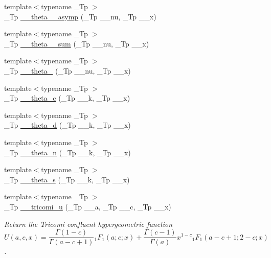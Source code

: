 \begin{DoxyCompactItemize}
\item 
{\footnotesize template$<$typename \+\_\+\+Tp $>$ }\\\+\_\+\+Tp \hyperlink{namespacestd_1_1____detail_a975a9a52a8a483849dd0877c24ca5d74}{\+\_\+\+\_\+theta\+\_\+\_\+asymp} (\+\_\+\+Tp \+\_\+\+\_\+nu, \+\_\+\+Tp \+\_\+\+\_\+x)
\item 
{\footnotesize template$<$typename \+\_\+\+Tp $>$ }\\\+\_\+\+Tp \hyperlink{namespacestd_1_1____detail_a3dc1b5188464b81b6acbb2983ef0f77c}{\+\_\+\+\_\+theta\+\_\+\_\+sum} (\+\_\+\+Tp \+\_\+\+\_\+nu, \+\_\+\+Tp \+\_\+\+\_\+x)
\item 
{\footnotesize template$<$typename \+\_\+\+Tp $>$ }\\\+\_\+\+Tp \hyperlink{namespacestd_1_1____detail_a274d3801b84bcaad13c274c8bab32bcc}{\+\_\+\+\_\+theta\+\_} (\+\_\+\+Tp \+\_\+\+\_\+nu, \+\_\+\+Tp \+\_\+\+\_\+x)
\item 
{\footnotesize template$<$typename \+\_\+\+Tp $>$ }\\\+\_\+\+Tp \hyperlink{namespacestd_1_1____detail_af95cdf16bfcf6c138d621b0c518a3299}{\+\_\+\+\_\+theta\+\_\+c} (\+\_\+\+Tp \+\_\+\+\_\+k, \+\_\+\+Tp \+\_\+\+\_\+x)
\item 
{\footnotesize template$<$typename \+\_\+\+Tp $>$ }\\\+\_\+\+Tp \hyperlink{namespacestd_1_1____detail_ad4ca29063a2f624e185592497d37a670}{\+\_\+\+\_\+theta\+\_\+d} (\+\_\+\+Tp \+\_\+\+\_\+k, \+\_\+\+Tp \+\_\+\+\_\+x)
\item 
{\footnotesize template$<$typename \+\_\+\+Tp $>$ }\\\+\_\+\+Tp \hyperlink{namespacestd_1_1____detail_aace76210c8f70761bb14ab602b88d027}{\+\_\+\+\_\+theta\+\_\+n} (\+\_\+\+Tp \+\_\+\+\_\+k, \+\_\+\+Tp \+\_\+\+\_\+x)
\item 
{\footnotesize template$<$typename \+\_\+\+Tp $>$ }\\\+\_\+\+Tp \hyperlink{namespacestd_1_1____detail_aeac5da2d394fafe6432871abf5c05413}{\+\_\+\+\_\+theta\+\_\+s} (\+\_\+\+Tp \+\_\+\+\_\+k, \+\_\+\+Tp \+\_\+\+\_\+x)
\item 
{\footnotesize template$<$typename \+\_\+\+Tp $>$ }\\\+\_\+\+Tp \hyperlink{namespacestd_1_1____detail_ae67133e463041158ebbffe6c54af6e0a}{\+\_\+\+\_\+tricomi\+\_\+u} (\+\_\+\+Tp \+\_\+\+\_\+a, \+\_\+\+Tp \+\_\+\+\_\+c, \+\_\+\+Tp \+\_\+\+\_\+x)
\begin{DoxyCompactList}\small\item\em Return the Tricomi confluent hypergeometric function \[ U(a,c,x) = \frac{\Gamma(1-c)}{\Gamma(a-c+1)} {}_1F_1(a;c;x) + \frac{\Gamma(c-1)}{\Gamma(a)} x^{1-c} {}_1F_1(a-c+1;2-c;x) \]. \end{DoxyCompactList}\item 

\end{DoxyCompactItemize}
